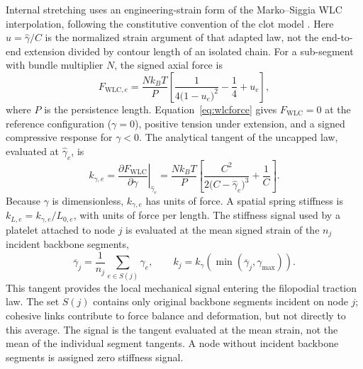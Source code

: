 \documentclass[twocolumn, 10pt]{article}
\begin{document}
Internal stretching uses an engineering-strain form of the Marko--Siggia WLC interpolation, following the constitutive convention of the clot model \cite{MarkoSiggia1995,Michael2023}. Here $u=\widehat\gamma/C$ is the normalized strain argument of that adapted law, not the end-to-end extension divided by contour length of an isolated chain. For a sub-segment with bundle multiplier $N$, the signed axial force is
\begin{equation}
    F_{\mathrm{WLC},e}
    = \frac{N k_B T}{P}
    \left[
        \frac{1}{4\bigl(1-u_e\bigr)^2}-\frac{1}{4}+u_e
    \right],
    \label{eq:wlcforce}
\end{equation}
where $P$ is the persistence length. Equation~\eqref{eq:wlcforce} gives $F_{\mathrm{WLC}}=0$ at the reference configuration ($\gamma=0$), positive tension under extension, and a signed compressive response for $\gamma<0$. The analytical tangent of the uncapped law, evaluated at $\widehat{\gamma}_e$, is
\begin{equation}
    k_{\gamma,e}
    = \left.\frac{\partial F_{\mathrm{WLC}}}{\partial\gamma}\right|_{\widehat{\gamma}_e}
    = \frac{N k_B T}{P}
    \left[
        \frac{C^2}{2\bigl(C-\widehat{\gamma}_e\bigr)^3}+\frac{1}{C}
    \right].
    \label{eq:wlctangent}
\end{equation}
Because $\gamma$ is dimensionless, $k_{\gamma,e}$ has units of force. A spatial spring stiffness is $k_{L,e}=k_{\gamma,e}/L_{0,e}$, with units of force per length. The stiffness signal used by a platelet attached to node $j$ is evaluated at the mean signed strain of the $n_j$ incident backbone segments,
\begin{equation}
    \overline{\gamma}_j
    = \frac{1}{n_j}\sum_{e\in S(j)}\gamma_e,
    \qquad
    k_j = k_\gamma\!\left(\min(\overline{\gamma}_j,\gamma_{\max})\right).
    \label{eq:wlcstiffness}
\end{equation}
This tangent provides the local mechanical signal entering the filopodial traction law. The set $S(j)$ contains only original backbone segments incident on node $j$; cohesive links contribute to force balance and deformation, but not directly to this average. The signal is the tangent evaluated at the mean strain, not the mean of the individual segment tangents. A node without incident backbone segments is assigned zero stiffness signal.
\end{document}
